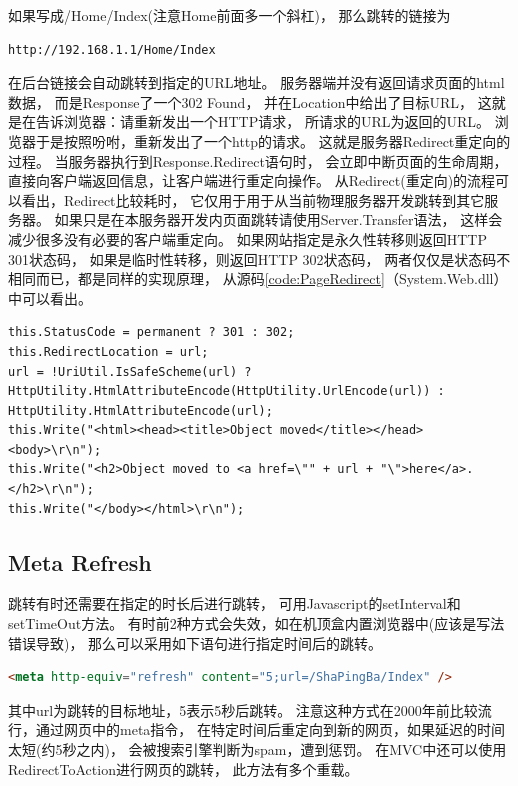 \documentclass{book}
\begin{document}
如果写成/Home/Index(注意Home前面多一个斜杠)，
那么跳转的链接为

\begin{lstlisting}[language=HTML]
http://192.168.1.1/Home/Index
\end{lstlisting}

在后台链接会自动跳转到指定的URL地址。
服务器端并没有返回请求页面的html数据，
而是Response了一个302 Found，
并在Location中给出了目标URL，
这就是在告诉浏览器：请重新发出一个HTTP请求，
所请求的URL为返回的URL。
浏览器于是按照吩咐，重新发出了一个http的请求。
这就是服务器Redirect重定向的过程。
当服务器执行到Response.Redirect语句时，
会立即中断页面的生命周期，直接向客户端返回信息，让客户端进行重定向操作。
从Redirect(重定向)的流程可以看出，Redirect比较耗时，
它仅用于用于从当前物理服务器开发跳转到其它服务器。
如果只是在本服务器开发内页面跳转请使用Server.Transfer语法，
这样会减少很多没有必要的客户端重定向。
如果网站指定是永久性转移则返回HTTP 301状态码，
如果是临时性转移，则返回HTTP 302状态码，
两者仅仅是状态码不相同而已，都是同样的实现原理，
从源码\ref{code:PageRedirect}（System.Web.dll）中可以看出。

\begin{lstlisting}[language={[Sharp]C},caption=Redirect实现片段,label={code:PageRedirect}]
this.StatusCode = permanent ? 301 : 302;
this.RedirectLocation = url;
url = !UriUtil.IsSafeScheme(url) ? HttpUtility.HtmlAttributeEncode(HttpUtility.UrlEncode(url)) : HttpUtility.HtmlAttributeEncode(url);
this.Write("<html><head><title>Object moved</title></head><body>\r\n");
this.Write("<h2>Object moved to <a href=\"" + url + "\">here</a>.</h2>\r\n");
this.Write("</body></html>\r\n");
\end{lstlisting}

\subsection{Meta Refresh}

跳转有时还需要在指定的时长后进行跳转，
可用Javascript的setInterval和setTimeOut方法。
有时前2种方式会失效，如在机顶盒内置浏览器中(应该是写法错误导致)，
那么可以采用如下语句进行指定时间后的跳转。

\begin{lstlisting}[language=HTML]
<meta http-equiv="refresh" content="5;url=/ShaPingBa/Index" />
\end{lstlisting}

其中url为跳转的目标地址，5表示5秒后跳转。
注意这种方式在2000年前比较流行，通过网页中的meta指令，
在特定时间后重定向到新的网页，如果延迟的时间太短(约5秒之内)，
会被搜索引擎判断为spam，遭到惩罚。
在MVC中还可以使用RedirectToAction进行网页的跳转，
此方法有多个重载。 
\end{document}
